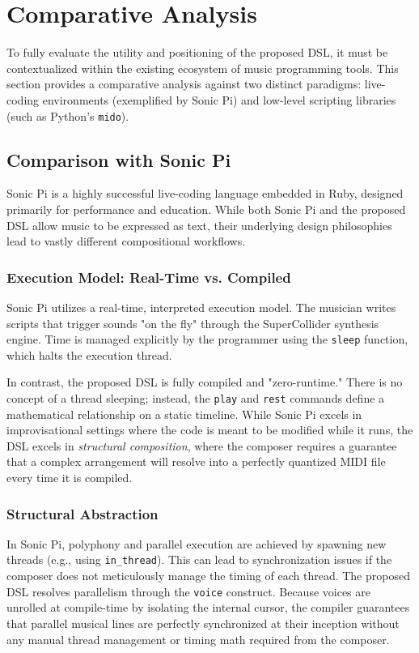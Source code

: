 \section{Comparative Analysis}\label{sec:evaluation-comparative}

To fully evaluate the utility and positioning of the proposed DSL, it must be contextualized within the
existing ecosystem of music programming tools.
This section provides a comparative analysis against two distinct paradigms: live-coding environments
(exemplified by Sonic Pi) and low-level scripting libraries (such as Python's \texttt{mido}).

\subsection{Comparison with Sonic Pi}

Sonic Pi is a highly successful live-coding language embedded in Ruby, designed primarily for performance and education.
While both Sonic Pi and the proposed DSL allow music to be expressed as text, their underlying design
philosophies lead to vastly different compositional workflows.

\subsubsection{Execution Model: Real-Time vs. Compiled}
Sonic Pi utilizes a real-time, interpreted execution model.
The musician writes scripts that trigger sounds "on the fly" through the SuperCollider synthesis engine.
Time is managed explicitly by the programmer using the \texttt{sleep} function, which halts the execution thread.

In contrast, the proposed DSL is fully compiled and "zero-runtime."
There is no concept of a thread sleeping; instead, the \texttt{play} and \texttt{rest} commands define a
mathematical relationship on a static timeline.
While Sonic Pi excels in improvisational settings where the code is meant to be modified while it runs, the
DSL excels in \textit{structural composition}, where the composer requires a guarantee that a complex
arrangement will resolve into a perfectly quantized MIDI file every time it is compiled.

\subsubsection{Structural Abstraction}
In Sonic Pi, polyphony and parallel execution are achieved by spawning new threads (e.g., using \texttt{in\_thread}).
This can lead to synchronization issues if the composer does not meticulously manage the timing of each thread.
The proposed DSL resolves parallelism through the \texttt{voice} construct.
Because voices are unrolled at compile-time by isolating the internal cursor, the compiler guarantees that
parallel musical lines are perfectly synchronized at their inception without any manual thread management or
timing math required from the composer.


